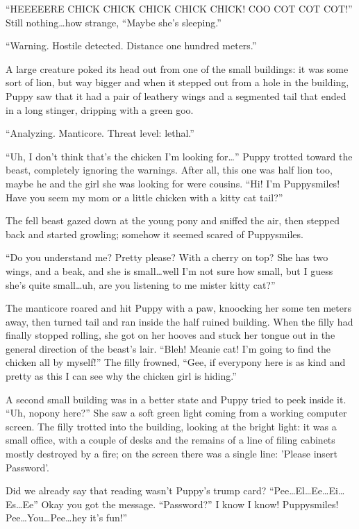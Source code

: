 ``HEEEEERE CHICK CHICK CHICK CHICK CHICK! COO COT COT COT!'' Still nothing\dots how strange, ``Maybe she's sleeping.''

``{\mt Warning. Hostile detected. Distance one hundred meters.}''

A large creature poked its head out from one of the small buildings: it was some sort of lion, but way bigger and when it stepped out from a hole in the building, Puppy saw that it had a pair of leathery wings and a segmented tail that ended in a long stinger, dripping with a green goo.

``{\mt Analyzing. Manticore. Threat level: lethal.}''

``Uh, I don't think that's the chicken I'm looking for\dots'' Puppy trotted toward the beast, completely ignoring the warnings. After all, this one was half lion too, maybe he and the girl she was looking for were cousins. ``Hi! I'm Puppysmiles! Have you seem my mom or a little chicken with a kitty cat tail?''

The fell beast gazed down at the young pony and sniffed the air, then stepped back and started growling; somehow it seemed scared of Puppysmiles.

``Do you understand me? Pretty please? With a cherry on top? She has two wings, and a beak, and she is small\dots well I'm not sure how small, but I guess she's quite small\dots uh, are you listening to me mister kitty cat?''

The manticore roared and hit Puppy with a paw, knoocking her some ten meters away, then turned tail and ran inside the half ruined building. When the filly had finally stopped rolling, she got on her hooves and stuck her tongue out in the general direction of the beast's lair. ``Bleh! Meanie cat! I'm going to find the chicken all by myself!'' The filly frowned, ``Gee, if everypony here is as kind and pretty as this I can see why the chicken girl is hiding.''

A second small building was in a better state and Puppy tried to peek inside it. ``Uh, nopony here?'' She saw a soft green light coming from a working computer screen. The filly trotted into the building, looking at the bright light: it was a small office, with a couple of desks and the remains of a line of filing cabinets mostly destroyed by a fire; on the screen there was a single line: '{\mt Please insert Password}'.

Did we already say that reading wasn't Puppy's trump card? ``Pee\dots El\dots Ee\dots Ei\dots Es\dots Ee'' Okay you got the message. ``Password?'' I know I know! Puppysmiles! Pee\dots You\dots Pee\dots hey it's fun!''

